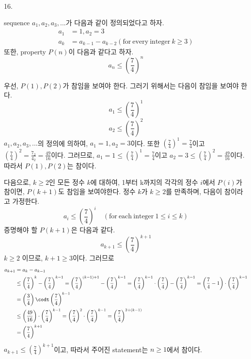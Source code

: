 \documentclass{article}
\begin{document}
16.
\begin{addmargin}[1em]{2em}
sequence $a_1, a_2, a_3,...$가 다음과 같이 정의되었다고 하자.
\begin{align*}
    a_1 &= 1, a_2 =3 \\
    a_k &= a_{k-1} - a_{k-2} (\mathrm{for\ every\ integer\ } k\ge 3)
\end{align*}
또한, property $P(n)$이 다음과 같다고 하자.
\[a_n \le \left( \frac{7}{4} \right)^n\]

우선, $P(1), P(2)$가 참임을 보여야 한다. 그러기 위해서는 다음이 참임을 보여야 한다.
\[a_1 \le \left( \frac{7}{4} \right)^1\]
\[a_2 \le \left( \frac{7}{4} \right)^2\]
$a_1, a_2, a_3,...$의 정의에 의하여, $a_1 =1, a_2=3$이다. 또한 $\left( \frac{7}{4} \right)^1 = \frac{7}{4}$이고 $\left( \frac{7}{4} \right)^2=\frac{7_2}{4_2}=\frac{49}{16}$이다. 그러므로, $a_1=1 \le \left( \frac{7}{4} \right)^1=\frac{7}{4}$이고 $a_2=3 \le \left( \frac{7}{4} \right)^2=\frac{49}{16}$이다. 따라서 $P(1), P(2)$는 참이다.
\newline

다음으로, $k\ge 2$인 모든 정수 $k$에 대하여, 1부터 k까지의 각각의 정수 $i$에서 $P(i)$가 참이면, $P(k+1)$도 참임을 보여야한다.
\newline
정수 $k$가  $k\ge 2$를 만족하며, 다음이 참이라고 가정한다.
\[a_i \le \left ( \frac{7}{4}\right)^i\quad(\mathrm{for\ each\ integer\ }1\le i \le k)\]
증명해야 할 $P(k+1)$은 다음과 같다.
\[a_{k+1} \le \left( \frac{7}{4} \right)^{k+1}\]
$k\ge 2$ 이므로, $k+1\ge 3$이다. 그러므로
\begin{align*}
    a_{k+1} &= a_k - a_{k-1} \\
    &\le \left( \frac{7}{4} \right)^{k} - \left( \frac{7}{4} \right)^{k-1} = \left( \frac{7}{4} \right)^{(k-1) + 1} - \left( \frac{7}{4} \right)^{k-1} = \left( \frac{7}{4} \right)^{k-1}\cdot\left( \frac{7}{4} \right) - \left( \frac{7}{4} \right)^{k-1} = \left( \frac{7}{4}-1 \right) \cdot \left( \frac{7}{4} \right)^{k-1} \\
    &=\left( \frac{3}{4} \right) \codt \left( \frac{7}{4} \right)^{k-1} \\
    &\le \left( \frac{49}{16} \right) \cdot \left( \frac{7}{4} \right)^{k-1} = \left( \frac{7}{4} \right)^2 \cdot \left( \frac{7}{4} \right)^{k-1} = \left( \frac{7}{4} \right)^{2+(k-1)} \\
    &= \left( \frac{7}{4} \right)^{k+1} \\
\end{align*}
$a_{k+1} \le \left( \frac{7}{4} \right)^{k+1}$이고, 따라서 주어진 statement는 $n\ge 1$에서 참이다. 
\end{addmargin}
\bigskip
\end{document}
